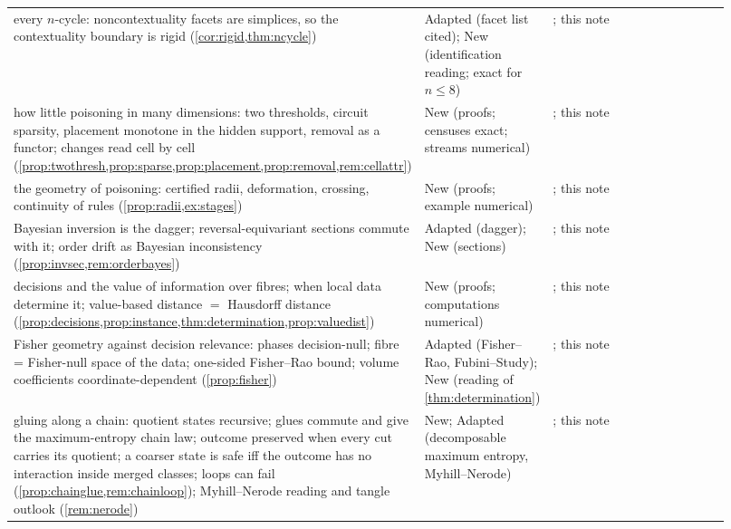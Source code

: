 \documentclass[11pt]{article}
\theoremstyle{definition}\newtheorem{definition}[theorem]{Definition}\newtheorem{remark}[theorem]{Remark}\newtheorem{example}[theorem]{Example}\newtheorem{problem}[theorem]{Open problem}\crefname{problem}{Problem}{Problems}
\begin{document}
{\begin{longtable}{p{0.46\linewidth}p{0.16\linewidth}p{0.3\linewidth}}
\rowcolor{stAdapted} every $n$-cycle: noncontextuality facets are simplices, so the contextuality boundary is rigid (\cref{cor:rigid,thm:ncycle}) & Adapted (facet list cited); New (identification reading; exact for $n\le8$) & \cite{AraujoEtAl2013}; this note\\
\rowcolor{stNew} how little poisoning in many dimensions: two thresholds, circuit sparsity, placement monotone in the hidden support, removal as a functor; changes read cell by cell (\cref{prop:twothresh,prop:sparse,prop:placement,prop:removal,rem:cellattr}) & New (proofs; censuses exact; streams numerical) & \cite{Rockafellar1969,MullerRegensburger2016,BroderickGiordanoMeager2020}; this note\\
\rowcolor{stNew} the geometry of poisoning: certified radii, deformation, crossing, continuity of rules (\cref{prop:radii,ex:stages}) & New (proofs; example numerical) & \cite{WalkupWets1969}; this note\\
\rowcolor{stAdapted} Bayesian inversion is the dagger; reversal-equivariant sections commute with it; order drift as Bayesian inconsistency (\cref{prop:invsec,rem:orderbayes}) & Adapted (dagger); New (sections) & \cite{ChoJacobs2019,Parzygnat2020,BohinenPerrone2025}; this note\\
\rowcolor{stNew} decisions and the value of information over fibres; when local data determine it; value-based distance $=$ Hausdorff distance (\cref{prop:decisions,prop:instance,thm:determination,prop:valuedist}) & New (proofs; computations numerical) & \cite{Das2023,Iskandar2026,TohmeCaterinaGangle2017,GensbittelPeskiRenault2022}; this note\\
\rowcolor{stAdapted} Fisher geometry against decision relevance: phases decision-null; fibre = Fisher-null space of the data; one-sided Fisher--Rao bound; volume coefficients coordinate-dependent (\cref{prop:fisher}) & Adapted (Fisher--Rao, Fubini--Study); New (reading of \cref{thm:determination}) & \cite{MoskowitzRussellLawless2020}; this note\\
\rowcolor{stNew} gluing along a chain: quotient states recursive; glues commute and give the maximum-entropy chain law; outcome preserved when every cut carries its quotient; a coarser state is safe iff the outcome has no interaction inside merged classes; loops can fail (\cref{prop:chainglue,rem:chainloop}); Myhill--Nerode reading and tangle outlook (\cref{rem:nerode}) & New; Adapted (decomposable maximum entropy, Myhill--Nerode) & \cite{Lauritzen1996,Nerode1958}; this note\\

\end{longtable}}
\end{document}
